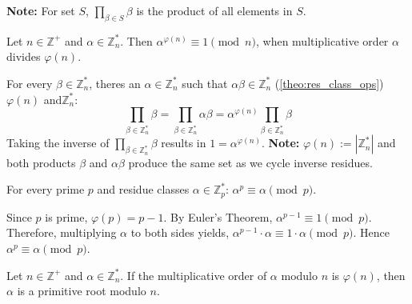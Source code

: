     \begin{Note}
        \textbf{Note:} For set $S$, $\prod_{\beta\in S}\beta$ is the product of all elements in $S$. 
    \end{Note}
    \begin{theo}
        
        Let $n\in\mathbb{Z^+}$ and $\alpha\in\mathbb{Z}_n^*$. Then $\alpha^{\varphi(n)}\equiv 1\pmod{n}$, when multiplicative order $\alpha$ divides $\varphi(n)$.
    \end{theo}
    \begin{Proof}
        For every $\beta\in\mathbb{Z}_n^*$, theres an $\alpha\in\mathbb{Z}_n^*$ such that $\alpha\beta\in\mathbb{Z}_n^*$ (\ref{theo:res_class_ops}) $\varphi(n)$ and$\mathbb{Z}_n^*$:
        \[\prod_{\beta\in\mathbb{Z}_n^*}\beta=\prod_{\beta\in\mathbb{Z}_n^*}\alpha\beta=\alpha^{\varphi(n)}\prod_{\beta\in\mathbb{Z}_n^*}\beta\]
        Taking the inverse of $\prod_{\beta\in\mathbb{Z}_n^*}\beta$ results in $1=\alpha^{\varphi(n)}$. \textbf{Note:} $\varphi(n):=|\mathbb{Z}_n^*|$ and both products $\beta$ and $\alpha\beta$ produce the same set as we cycle inverse residues.
        

    \end{Proof}

    \newpage

    \begin{theo}
        
        \label{theo:fermat}

        For every prime $p$ and residue classes $\alpha\in\mathbb{Z}_p^*$: $\alpha^{p} \equiv \alpha \pmod{p}$.
    \end{theo}

    \begin{Proof}
        Since $p$ is prime, $\varphi(p)=p-1$. By Euler's Theorem, $\alpha^{p-1} \equiv 1 \pmod{p}$. 
        Therefore, multiplying $\alpha$ to both sides yields, $\alpha^{p-1} \cdot \alpha \equiv 1 \cdot \alpha \pmod{p}$. Hence $\alpha^p \equiv \alpha \pmod{p}$.
    \end{Proof}

    \begin{Def}
        
        Let $n\in\mathbb{Z^+}$ and $\alpha\in\mathbb{Z}_n^*$. If the multiplicative order of $\alpha$ modulo $n$ is $\varphi(n)$, then $\alpha$ is a primitive root modulo $n$.
    \end{Def}

